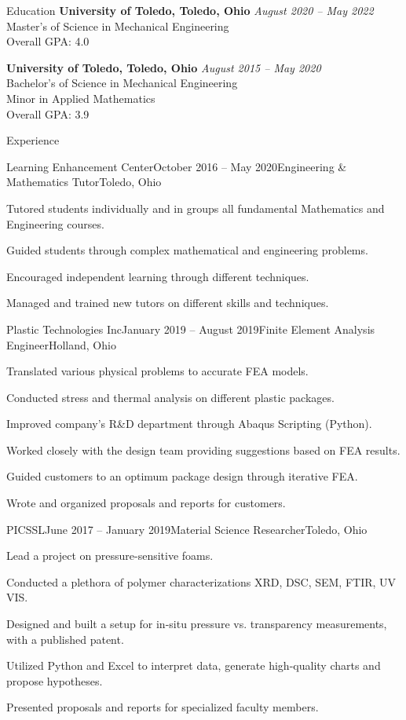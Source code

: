 \documentclass{bilal}
\begin{document}

\begin{rSection}{Education}
{\bf University of Toledo, Toledo, Ohio} \hfill {\em August 2020 -- May 2022} \\ 
Master's of Science in Mechanical Engineering \\
Overall GPA: 4.0

{\bf University of Toledo, Toledo, Ohio} \hfill {\em August 2015 -- May 2020} \\ 
Bachelor's of Science in Mechanical Engineering \\
Minor in Applied Mathematics \smallskip \\
Overall GPA: 3.9
\end{rSection}
\begin{rSection}{Experience}
    \begin{rSubsection}{Learning Enhancement Center}{October 2016 -- May 2020}{Engineering \& Mathematics Tutor}{Toledo, Ohio}
\item Tutored students individually and in groups all fundamental Mathematics and Engineering courses.
\item Guided students through complex mathematical and engineering problems.
\item Encouraged independent learning through different techniques.
\item Managed and trained new tutors on different skills and techniques.
\end{rSubsection}
\begin{rSubsection}{Plastic Technologies Inc}{January 2019 -- August 2019}{Finite Element Analysis Engineer}{Holland, Ohio}
\item Translated various physical problems to accurate FEA models.
\item Conducted stress and thermal analysis on different plastic packages.
\item Improved company's R\&D department through Abaqus Scripting (Python).
\item Worked closely with the design team providing suggestions based on FEA results.
\item Guided customers to an optimum package design through iterative FEA.
\item Wrote and organized proposals and reports for customers.
\end{rSubsection}
\begin{rSubsection}{PICSSL}{June 2017 -- January 2019}{Material Science Researcher}{Toledo, Ohio}
\item Lead a project on pressure-sensitive foams.
\item Conducted a plethora of polymer characterizations XRD, DSC, SEM, FTIR, UV VIS.
\item Designed and built a setup for in-situ pressure vs. transparency measurements, with a published patent.
\item Utilized Python and Excel to interpret data, generate high-quality charts and propose hypotheses.
\item Presented proposals and reports for specialized faculty members.
\end{rSubsection}
\end{rSection}
\end{document}
